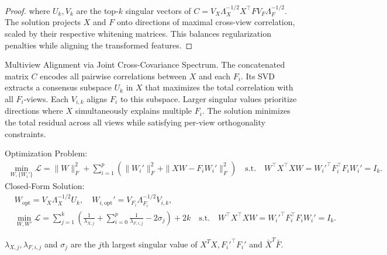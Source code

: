\begin{proof}
where \( U_k, V_k \) are the top-\(k \) singular vectors of \( C = V_X\Lambda_X^{-1/2} X^\top F V_F\Lambda_F^{-1/2} \). The solution projects \( X \) and \( F \) onto directions of maximal cross-view correlation, scaled by their respective whitening matrices. This balances regularization penalties while aligning the transformed features.  
\end{proof}

    
\begin{lemma}\label{lem:multiCCA}
Multiview Alignment via Joint Cross-Covariance Spectrum.
The concatenated matrix \( C \) encodes all pairwise correlations between \( X \) and each \( F_i \). Its SVD extracts a consensus subspace \( U_k \) in \( X \) that maximizes the total correlation with all \( F_i \)-views. Each \( V_{i,k} \) aligns \( F_i \) to this subspace. Larger singular values prioritize directions where \( X \) simultaneously explains multiple \( F_i \). The solution minimizes the total residual across all views while satisfying per-view orthogonality constraints.

Optimization Problem:  
\begin{equation}
\begin{aligned}
\min_{W, \{W_i'\}} \mathcal{L} = \|W\|_F^2 + \sum_{i=1}^p \left( \|W_i'\|_F^2 + \|XW - F_i W_i'\|_F^2 \right) \quad \text{s.t.} \quad W^\top X^\top X W = W_i'^\top F_i^\top F_i W_i' = I_k.
\end{aligned}
\end{equation}  
Closed-Form Solution:  
\begin{equation}
\begin{aligned}
& W_{\text{opt}} = V_X\Lambda_X^{-1/2} U_k, \quad W_{i,\text{opt}}' = V_{F_i}\Lambda_{F_i}^{-1/2} V_{i,k}, \\
& \min_{W, W'} \mathcal{L} = \sum_{j=1}^{k} ( \frac{1}{\lambda_{X,j}} + \sum_{i=0}^p \frac{1}{\lambda_{F,i,j}} - 2 \sigma_j ) + 2k \quad \text{s.t.} \quad W^\top X^\top X W = W_i'^\top F_i^\top F_i W_i' = I_k.
\end{aligned}
\end{equation}  

$\lambda_{X,j}, \lambda_{F,i,j}$ and $\sigma_j$ are the $j$th largest singular value of $X^TX, F_i'^\top F_i'$ and $\bar{X}^T \bar{F}$.

\end{lemma}

